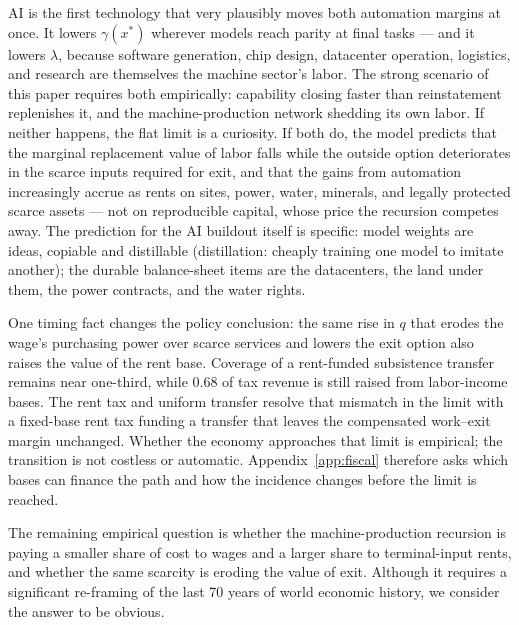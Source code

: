 \documentclass[12pt]{article}
\theoremstyle{plain}
\begin{document}
AI is the first technology that very plausibly moves both automation margins at once. It lowers $\gamma (x^*)$ wherever models reach parity at final tasks --- and it lowers $\lambda$, because software generation, chip design, datacenter operation, logistics, and research are themselves the machine sector's labor. The strong scenario of this paper requires both empirically: capability closing faster than reinstatement replenishes it, and the machine-production network shedding its own labor. If neither happens, the flat limit is a curiosity. If both do, the model predicts that the marginal replacement value of labor falls while the outside option deteriorates in the scarce inputs required for exit, and that the gains from automation increasingly accrue as rents on sites, power, water, minerals, and legally protected scarce assets --- not on reproducible capital, whose price the recursion competes away. The prediction for the AI buildout itself is specific: model weights are ideas, copiable and distillable (distillation: cheaply training one model to imitate another); the durable balance-sheet items are the datacenters, the land under them, the power contracts, and the water rights.

One timing fact changes the policy conclusion: the same rise in $q$ that erodes the wage's purchasing power over scarce services and lowers the exit option also raises the value of the rent base. Coverage of a rent-funded subsistence transfer remains near one-third, while 0.68 of tax revenue is still raised from labor-income bases. The rent tax and uniform transfer resolve that mismatch in the limit with a fixed-base rent tax funding a transfer that leaves the compensated work--exit margin unchanged. Whether the economy approaches that limit is empirical; the transition is not costless or automatic. Appendix~\ref{app:fiscal} therefore asks which bases can finance the path and how the incidence changes before the limit is reached.

The remaining empirical question is whether the machine-production recursion
is paying a smaller share of cost to wages and a larger share to
terminal-input rents, and whether the same scarcity is eroding the value of
exit. Although it requires a significant re-framing of the last 70 years of world economic history, we consider the answer to be obvious.

\appendix
{}
\end{document}
